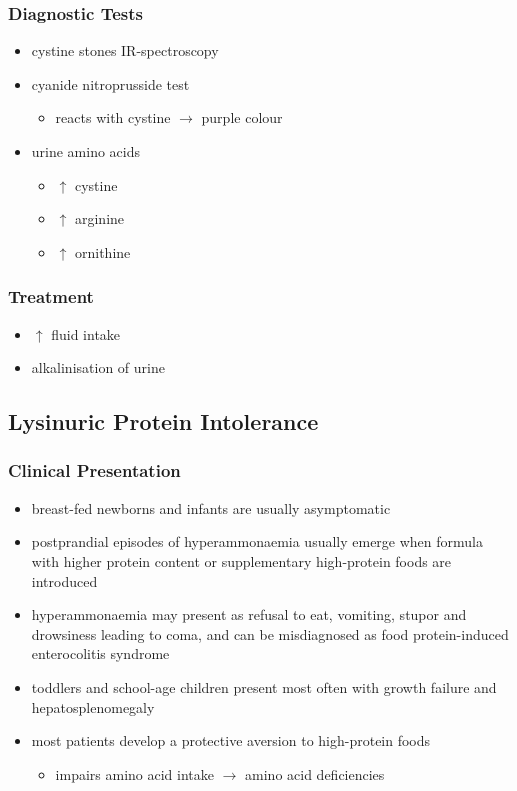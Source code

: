 \documentclass{scrartcl}
\begin{document}
\subsubsection{Diagnostic Tests}
\label{sec:orge2dab58}
\begin{itemize}
\item cystine stones IR-spectroscopy
\item cyanide nitroprusside test
\begin{itemize}
\item reacts with cystine \(\to\) purple colour
\end{itemize}
\item urine amino acids
\begin{itemize}
\item \(\uparrow\) cystine
\item \(\uparrow\) arginine
\item \(\uparrow\) ornithine
\end{itemize}
\end{itemize}

\subsubsection{Treatment}
\label{sec:org68286e0}
\begin{itemize}
\item \(\uparrow\) fluid intake
\item alkalinisation of urine
\end{itemize}

\subsection{Lysinuric Protein Intolerance}
\label{sec:org759efdd}
\subsubsection{Clinical Presentation}
\label{sec:org70d35b9}
\begin{itemize}
\item breast-fed newborns and infants are usually
asymptomatic
\item postprandial episodes of hyperammonaemia usually emerge when formula
with higher protein content or supplementary high-protein foods are
introduced
\item hyperammonaemia may present as refusal to eat, vomiting, stupor and
drowsiness leading to coma, and can be misdiagnosed as food
protein-induced enterocolitis syndrome
\item toddlers and school-age children present most often with growth
failure and hepatosplenomegaly
\item most patients develop a protective aversion to high-protein foods
\begin{itemize}
\item impairs amino acid intake \(\to\) amino acid deficiencies
\end{itemize}
\end{itemize}
\end{document}
